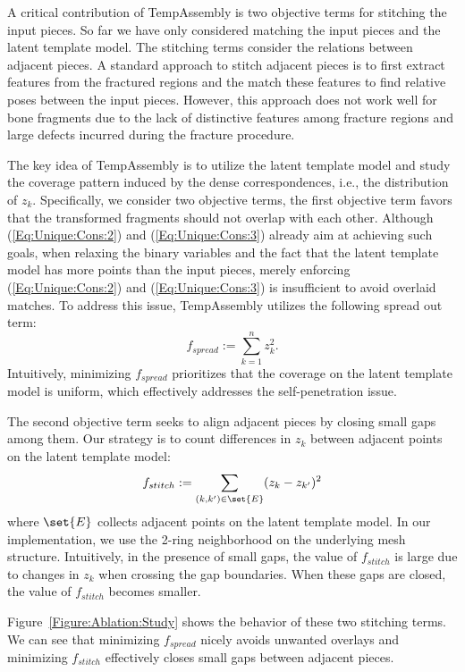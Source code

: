 A critical contribution of TempAssembly is two objective terms for stitching the input pieces. So far we have only considered matching the input pieces and the latent template model. The stitching terms consider the relations between adjacent pieces. A standard approach to stitch adjacent pieces is to first extract features from the fractured regions and the match these features to find relative poses between the input pieces. However, this approach does not work well for bone fragments due to the lack of distinctive features among fracture regions and large defects incurred during the fracture procedure. 

The key idea of TempAssembly is to utilize the latent template model and study the coverage pattern induced by the dense correspondences, i.e., the distribution of $z_k$. Specifically, we consider two objective terms, the first objective term favors that the transformed fragments should not overlap with each other. Although (\ref{Eq:Unique:Cons:2}) and (\ref{Eq:Unique:Cons:3}) already aim at achieving such goals, when relaxing the binary variables and the fact that the latent template model has more points than the input pieces, merely enforcing (\ref{Eq:Unique:Cons:2}) and (\ref{Eq:Unique:Cons:3}) is insufficient to avoid overlaid matches. To address this issue, TempAssembly utilizes the following spread out term:
\begin{equation}
f_{spread}:= \sum\limits_{k=1}^n z_k^2.
\label{Eq:Spread:Term}
\end{equation}
Intuitively, minimizing $f_{spread}$ prioritizes that the coverage on the latent template model is uniform, which effectively addresses the self-penetration issue. 

The second objective term seeks to align adjacent pieces by closing small gaps among them. Our strategy is to count differences in $z_k$ between adjacent points on the latent template model:
\begin{equation}
f_{stitch}:= \sum\limits_{(k,k')\in \set{E}}(z_k-z_{k'})^2    
\label{Eq:Stitch:Term}
\end{equation}
where $\set{E}$ collects adjacent points on the latent template model. In our implementation, we use the 2-ring neighborhood on the underlying mesh structure. Intuitively, in the presence of small gaps, the value of $f_{stitch}$ is large due to changes in $z_k$ when crossing the gap boundaries. When these gaps are closed, the value of $f_{stitch}$ becomes smaller. 

Figure~\ref{Figure:Ablation:Study} shows the behavior of these two stitching terms. We can see that minimizing $f_{spread}$ nicely avoids unwanted overlays and minimizing $f_{stitch}$ effectively closes small gaps between adjacent pieces. 

